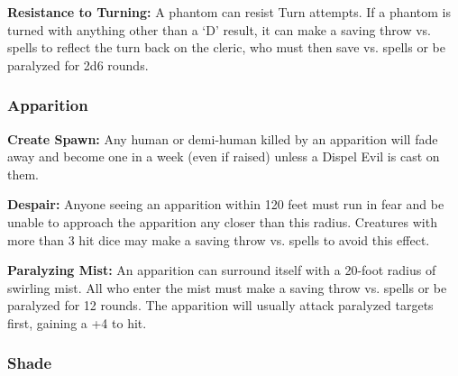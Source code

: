 \begin{multicols*}{2}
\textbf{Resistance to Turning:} A phantom can resist Turn attempts. If a phantom is turned with anything other than a ‘D’ result, it can make a saving throw vs. spells to reflect the turn back on the cleric, who must then save vs. spells or be paralyzed for 2d6 rounds.

\subsubsection{Apparition}

\textbf{Create Spawn:} Any human or demi-human killed by an apparition will fade away and become one in a week (even if raised) unless a Dispel Evil is cast on them.

\textbf{Despair:} Anyone seeing an apparition within 120 feet must run in fear and be unable to approach the apparition any closer than this radius. Creatures with more than 3 hit dice may make a saving throw vs. spells to avoid this effect.

\textbf{Paralyzing Mist:} An apparition can surround itself with a 20-foot radius of swirling mist. All who enter the mist must make a saving throw vs. spells or be paralyzed for 12 rounds. The apparition will usually attack paralyzed targets first, gaining a +4 to hit.

\subsubsection{Shade}
\end{multicols*}

